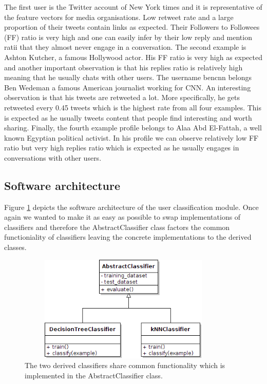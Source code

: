 The first user is the Twitter account of New York times and it is representative of the feature vectors for media organisations. Low retweet rate and a large proportion of their tweets contain links as expected. Their Followers to Followees (FF) ratio is very high and one can easily infer by their low reply and mention ratii that they almost never engage in a conversation. The second example is Ashton Kutcher, a famous Hollywood actor. His FF ratio is very high as expected and another important observation is that his replies ratio is relatively high meaning that he usually chats with other users. The username bencnn belongs Ben Wedeman a famous American journalist working for CNN. An interesting observation is that his tweets are retweeted a lot. More specifically, he gets retweeted every 0.45 tweets which is the highest rate from all four examples. This is expected as he usually tweets content that people find interesting and worth sharing. Finally, the fourth example profile belongs to Alaa Abd El-Fattah, a well known Egyptian political activist. In his profile we can observe relatively low FF ratio but very high replies ratio which is expected as he usually engages in conversations with other users.

\subsection{Software architecture}
Figure \ref{Classifiers} depicts the software architecture of the user classification module. Once again we wanted to make it as easy as possible to swap implementations of classifiers and therefore
the AbstractClassifier class factors the common functioniality of classifiers leaving the concrete implementations to the derived classes. 

\begin{figure}[htbp]
  \begin{center}
    \includegraphics[height=2in, width=4in]{classifiers}
    \caption{The two derived classifiers share common functionality which is implemented in the AbstractClassifier class. }
    \label{Classifiers}
  \end{center}
\end{figure} 

